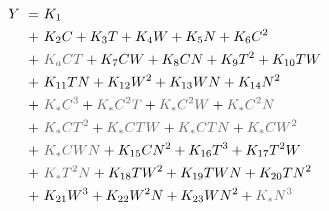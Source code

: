 \documentclass[gmdd]{copernicus} %
\providecommand{\DIFaddbegin}{} %
\providecommand{\DIFaddend}{} %
\providecommand{\DIFdelend}{} %
\begin{document}
\DIFdelend \DIFaddbegin \vspace{-0.1in}
\DIFaddend \begin{align}
    \hspace{10mm}  \label{eqn:features_reduced}
        Y\ = \ & K_{1} \\
        + \ & K_{2} C                        + K_{3} T                        + K_{4} W                        + K_{5} N       + K_{6} C^2      \nonumber \\
        + \ & {\color{dark-gray}K_{a} C T}   + K_{7} C W                      + K_{8} C N                      + K_{9} T^2     + K_{10} T W     \nonumber \\
        + \ & K_{11} T N                     + K_{12} W^2                     + K_{13} W N                     + K_{14} N^2                     \nonumber \\
        + \ & {\color{dark-gray}K_{*} C^3}   + {\color{dark-gray}K_{*} C^2 T} + {\color{dark-gray}K_{*} C^2 W} + {\color{dark-gray}K_{*} C^2 N} \nonumber \\
        + \ & {\color{dark-gray}K_{*} C T^2} + {\color{dark-gray}K_{*} C T W} + {\color{dark-gray}K_{*} C T N} + {\color{dark-gray}K_{*} C W^2} \nonumber \\
        + \ & {\color{dark-gray}K_{*} C W N} + K_{15} C N^2                   + K_{16} T^3                     + K_{17} T^2 W                   \nonumber \\
        + \ & {\color{dark-gray}K_{*} T^2 N} + K_{18} T W^2                   + K_{19} T W N                   + K_{20} T N^2                   \nonumber \\
        + \ & K_{21} W^3                     + K_{22} W^2 N                   + K_{23} W N^2                   + {\color{dark-gray}K_{*} N^3}   \nonumber
\end{align}
\end{document}

